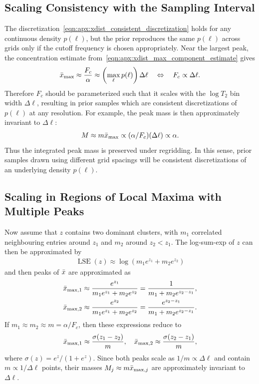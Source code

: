 \subsection{Scaling Consistency with the Sampling Interval}

The discretization~\eqref{eqn:apx:xdist_consistent_discretization} holds for any continuous density $p(\ell)$, but the prior reproduces the same $p(\ell)$ across grids only if the cutoff frequency is chosen appropriately.
Near the largest peak, the concentration estimate from~\cref{eqn:apx:xdist_max_component_estimate} gives
\begin{align}
    \bar{x}_{\max} \approx \frac{F_c}{\alpha} \approx \left(\max_{\ell} p(\ell)\right) \Delta\ell \quad \Leftrightarrow \quad
    F_c \propto \Delta\ell.
\end{align}
Therefore $F_c$ should be parameterized such that it scales with the $\log T_2$ bin width $\Delta\ell$, resulting in prior samples which are consistent discretizations of $p(\ell)$ at any resolution.
For example, the peak mass is then approximately invariant to $\Delta\ell$:
\begin{align}
    M \approx m \bar{x}_{\max} \propto (\alpha / F_c) (\Delta \ell) \propto \alpha.
\end{align}
Thus the integrated peak mass is preserved under regridding.
In this sense, prior samples drawn using different grid spacings will be consistent discretizations of an underlying density $p(\ell)$.

\subsection{Scaling in Regions of Local Maxima with Multiple Peaks}

Now assume that $z$ contains two dominant clusters, with $m_1$ correlated neighbouring entries around $z_1$ and $m_2$ around $z_2 < z_1$.
The log-sum-exp of $z$ can then be approximated by
\begin{align}
    \operatorname{LSE}(z) \approx \log(m_1 e^{z_1} + m_2 e^{z_2})
\end{align}
and then peaks of $\bar{x}$ are approximated as
\begin{align}
    \bar{x}_{\max,1} & \approx \frac{e^{z_1}}{m_1 e^{z_1} + m_2 e^{z_2}} = \frac{1}{m_1 + m_2 e^{z_2 - z_1}},             \\
    \bar{x}_{\max,2} & \approx \frac{e^{z_2}}{m_1 e^{z_1} + m_2 e^{z_2}} = \frac{e^{z_2 - z_1}}{m_1 + m_2 e^{z_2 - z_1}}.
\end{align}
If $m_1 \approx m_2 \approx m = \alpha / F_c$, then these expressions reduce to
\begin{align}
    \bar{x}_{\max,1} \approx \frac{\sigma(z_1 - z_2)}{m}, \quad
    \bar{x}_{\max,2} \approx \frac{\sigma(z_2 - z_1)}{m},
\end{align}
where $\sigma(z) = e^z / (1 + e^z)$.
Since both peaks scale as $1 / m \propto \Delta\ell$ and contain $m \propto 1 / \Delta\ell$ points, their masses $M_j \approx m \bar{x}_{\max,j}$ are approximately invariant to $\Delta\ell$.

